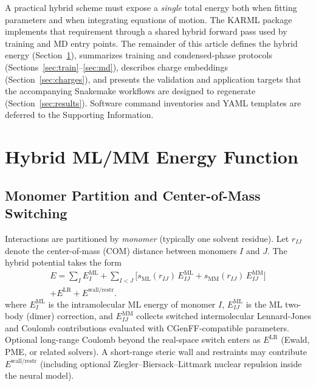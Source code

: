 \documentclass[journal=jctc,manuscript=article]{achemso}
\begin{document}
A practical hybrid scheme must expose a \emph{single} total energy both when
fitting parameters and when integrating equations of motion. The KARML
package\cite{KARML2026} implements that requirement through a shared hybrid
forward pass used by training and MD entry points. The remainder of this
article defines the hybrid energy (Section~\ref{sec:energy}), summarizes
training and condensed-phase protocols (Sections~\ref{sec:train}--\ref{sec:md}),
describes charge embeddings (Section~\ref{sec:charges}), and presents the
validation and application targets that the accompanying Snakemake workflows
are designed to regenerate (Section~\ref{sec:results}). Software command
inventories and YAML templates are deferred to the Supporting Information.

\section{Hybrid ML/MM Energy Function}
\label{sec:energy}

\subsection{Monomer Partition and Center-of-Mass Switching}

Interactions are partitioned by \emph{monomer} (typically one solvent residue).
Let \(r_{IJ}\) denote the center-of-mass (COM) distance between monomers \(I\)
and \(J\). The hybrid potential takes the form
\begin{multline}
\label{eq:hybrid-E}
E = \sum_I E_I^{\mathrm{ML}}
  + \sum_{I<J}\bigl[
        s_{\mathrm{ML}}(r_{IJ})\,E_{IJ}^{\mathrm{ML}}
      + s_{\mathrm{MM}}(r_{IJ})\,E_{IJ}^{\mathrm{MM}}
    \bigr] \\
  + E^{\mathrm{LR}} + E^{\mathrm{wall/restr}}.
\end{multline}
where \(E_I^{\mathrm{ML}}\) is the intramolecular ML energy of monomer \(I\),
\(E_{IJ}^{\mathrm{ML}}\) is the ML two-body (dimer) correction, and
\(E_{IJ}^{\mathrm{MM}}\) collects switched intermolecular Lennard-Jones and
Coulomb contributions evaluated with CGenFF-compatible parameters. Optional
long-range Coulomb beyond the real-space switch enters as \(E^{\mathrm{LR}}\)
(Ewald,\cite{Ewald1921} PME,\cite{Darden1993,Essmann1995} or related solvers).
A short-range steric wall and restraints may contribute
\(E^{\mathrm{wall/restr}}\) (including optional Ziegler--Biersack--Littmark
nuclear repulsion inside the neural model\cite{Ziegler1985}).
\end{document}
